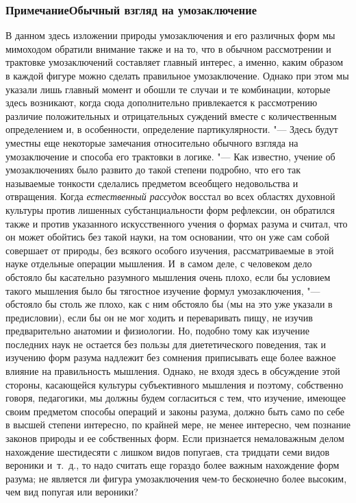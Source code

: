 \subsubsection[Примечание Обычный взгляд на умозаключение]
{Примечание\newline Обычный взгляд на умозаключение}

В данном здесь изложении природы умозаключения и его различных
форм мы мимоходом обратили внимание также и на то, что в обычном
рассмотрении и трактовке умозаключений составляет главный
интерес, а именно, каким образом в каждой фигуре можно сделать правильное
умозаключение. Однако при этом мы указали лишь главный момент и обошли те
случаи и те комбинации, которые здесь возникают, когда сюда дополнительно
привлекается к рассмотрению различие положительных и отрицательных суждений
вместе с количественным определением и, в особенности, определение
партикулярности. "--- Здесь будут уместны еще некоторые
замечания относительно обычного взгляда на умозаключение и способа его
трактовки в логике. "--- Как известно, учение об умозаключениях
было развито до такой степени подробно, что его так называемые тонкости
сделались предметом всеобщего недовольства и отвращения. Когда
{\em естественный рассудок}
восстал во всех областях духовной культуры против лишенных
субстанциальности форм рефлексии, он обратился также и против указанного
искусственного учения о формах разума и считал, что он может обойтись без
такой науки, на том основании, что он уже сам собой совершает от природы,
без всякого особого изучения, рассматриваемые в этой науке отдельные
операции мышления. И~в самом деле, с человеком дело обстояло бы касательно
разумного мышления очень плохо, если бы условием такого мышления было бы
тягостное изучение формул умозаключения, "--- обстояло бы столь
же плохо, как с ним обстояло бы (мы на это уже указали в
предисловии),
если бы он не мог ходить и переваривать пищу, не изучив
предварительно анатомии и физиологии. Но, подобно тому как изучение
последних наук не остается без пользы для диететического поведения, так и
изучению форм разума надлежит без сомнения приписывать еще более важное
влияние на правильность мышления. Однако, не входя здесь в обсуждение этой
стороны, касающейся культуры субъективного мышления и поэтому, собственно
говоря, педагогики, мы должны будем согласиться с тем, что изучение,
имеющее своим предметом способы операций и законы разума, должно быть само
по себе в высшей степени интересно, по крайней мере, не менее интересно,
чем познание законов природы и ее собственных форм. Если признается
немаловажным делом нахождение шестидесяти с лишком видов попугаев, ста
тридцати семи видов вероники и~т.~д., то надо считать еще гораздо более
важным нахождение форм разума; не является ли фигура умозаключения чем-то
бесконечно более высоким, чем вид попугая или вероники?

